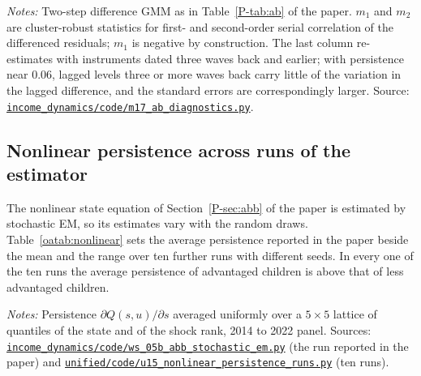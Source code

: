 \documentclass[11pt]{article}
\numberwithin{equation}{section}
\newcommand{\repourl}{https://github.com/JiachenJin1001/family-background-earnings-china}
\newcommand{\code}[1]{\href{\repourl/blob/main/#1}{\nolinkurl{#1}}}
\begin{document}
\begin{table}[H]
\centering
\small
\caption{Serial-correlation tests for the Arellano--Bond estimates.}
\label{oatab:abdiag}
\setlength{\tabcolsep}{4pt}

\par\smallskip
\begin{minipage}{0.94\textwidth}
\footnotesize\emph{Notes:} Two-step difference GMM as in
Table~\ref{P-tab:ab} of the paper. $m_1$ and $m_2$ are cluster-robust
statistics for first- and second-order serial correlation of the
differenced residuals; $m_1$ is negative by construction. The last column re-estimates with instruments dated three waves back and earlier; with persistence near 0.06, lagged levels three or more waves back carry little of the variation in the lagged difference, and the standard errors are correspondingly larger. Source:
\code{income_dynamics/code/m17_ab_diagnostics.py}.
\end{minipage}
\end{table}

\subsection{Nonlinear persistence across runs of the estimator}
\label{oa:nonlinear}

The nonlinear state equation of Section~\ref{P-sec:abb} of the paper is estimated by stochastic EM, so its estimates vary with the random draws. Table~\ref{oatab:nonlinear} sets the average persistence reported in the paper beside the mean and the range over ten further runs with different seeds. In every one of the ten runs the average persistence of advantaged children is above that of less advantaged children.

\begin{table}[H]
\centering
\small
\caption{Average nonlinear persistence: the run reported in the paper and ten further runs.}
\label{oatab:nonlinear}

\par\smallskip
\begin{minipage}{0.86\textwidth}
\footnotesize\emph{Notes:} Persistence $\partial Q(s, u)/\partial s$ averaged uniformly over a $5 \times 5$ lattice of quantiles of the state and of the shock rank, 2014 to 2022 panel. Sources: \code{income_dynamics/code/ws_05b_abb_stochastic_em.py} (the run reported in the paper) and \code{unified/code/u15_nonlinear_persistence_runs.py} (ten runs).
\end{minipage}
\end{table}
\end{document}
